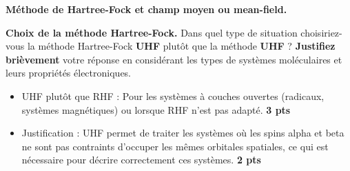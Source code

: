 \documentclass[a4paper,answers]{exam} %
\newcommand{\pts}[1]{\textbf{#1 pts}}
\begin{document}
\begin{questions}
\question[5] \textbf{Méthode de Hartree-Fock et champ moyen ou mean-field.}

\question[5] \textbf{Choix de la méthode Hartree-Fock.} Dans quel type de situation choisiriez-vous la méthode Hartree-Fock \textbf{UHF} plutôt que la méthode \textbf{UHF} ? \textbf{Justifiez brièvement} votre réponse en considérant les types de systèmes moléculaires et leurs propriétés électroniques.

\begin{solution}
\begin{itemize}
    \item UHF plutôt que RHF : Pour les systèmes à couches ouvertes (radicaux, systèmes magnétiques) ou lorsque RHF n'est pas adapté. \hfill \pts{3}
    \item Justification : UHF permet de traiter les systèmes où les spins alpha et beta ne sont pas contraints d'occuper les mêmes orbitales spatiales, ce qui est nécessaire pour décrire correctement ces systèmes. \hfill \pts{2}
\end{itemize}
\end{solution}


\end{questions}
\end{document}
